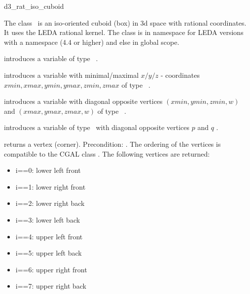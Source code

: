 \ccDefGlobalScope{}
\begin{ccRefClass}{d3_rat_iso_cuboid}

\ccDefinition


The class \ccRefName\  is an iso-oriented cuboid (box)
in 3d space with rational coordinates. It uses the LEDA rational kernel. 
The class is in namespace  for LEDA versions with a namespace
(4.4 or higher) and else in global scope.



\ccCreation

{introduces a variable of type \ccRefName\ .}  
  
{introduces a variable with minimal/maximal $x/y/z$ - coordinates $xmin,xmax,ymin,ymax,zmin,zmax$
of type \ccRefName\ . } 

{introduces a variable with diagonal opposite vertices $(xmin,ymin,zmin,w)$ and $(xmax,ymax,zmax,w)$
of type \ccRefName\ .}
  
{introduces a variable of type \ccRefName\ with diagonal opposite vertices $p$ and $q$ . }  



\ccOperations

{returns a vertex (corner). Precondition:  .
The ordering of the vertices is compatible to the CGAL class .
The following vertices are returned:
}
\begin{itemize}
\item i==0: lower left front 
\item i==1: lower right front
\item i==2: lower right back
\item i==3: lower left back
\item i==4: upper left front
\item i==5: upper left back
\item i==6: upper right front
\item i==7: upper right back
\end{itemize}


\end{ccRefClass}
